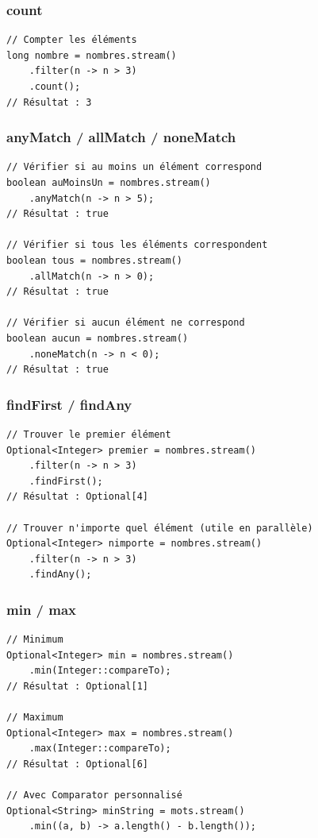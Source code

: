\documentclass[11pt,a4paper]{article}
\begin{document}
\subsubsection{count}

\begin{lstlisting}
// Compter les éléments
long nombre = nombres.stream()
    .filter(n -> n > 3)
    .count();
// Résultat : 3
\end{lstlisting}

\subsubsection{anyMatch / allMatch / noneMatch}

\begin{lstlisting}
// Vérifier si au moins un élément correspond
boolean auMoinsUn = nombres.stream()
    .anyMatch(n -> n > 5);
// Résultat : true

// Vérifier si tous les éléments correspondent
boolean tous = nombres.stream()
    .allMatch(n -> n > 0);
// Résultat : true

// Vérifier si aucun élément ne correspond
boolean aucun = nombres.stream()
    .noneMatch(n -> n < 0);
// Résultat : true
\end{lstlisting}

\subsubsection{findFirst / findAny}

\begin{lstlisting}
// Trouver le premier élément
Optional<Integer> premier = nombres.stream()
    .filter(n -> n > 3)
    .findFirst();
// Résultat : Optional[4]

// Trouver n'importe quel élément (utile en parallèle)
Optional<Integer> nimporte = nombres.stream()
    .filter(n -> n > 3)
    .findAny();
\end{lstlisting}

\subsubsection{min / max}

\begin{lstlisting}
// Minimum
Optional<Integer> min = nombres.stream()
    .min(Integer::compareTo);
// Résultat : Optional[1]

// Maximum
Optional<Integer> max = nombres.stream()
    .max(Integer::compareTo);
// Résultat : Optional[6]

// Avec Comparator personnalisé
Optional<String> minString = mots.stream()
    .min((a, b) -> a.length() - b.length());
\end{lstlisting}
\end{document}
